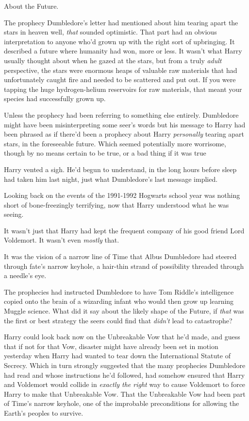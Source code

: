 About the Future.

The prophecy Dumbledore's letter had mentioned about him tearing apart the
stars in heaven{\el} well, \emph{that} sounded optimistic. That part had an
obvious interpretation to anyone who'd grown up with the right sort of
upbringing. It described a future where humanity had won, more or less. It
wasn't what Harry usually thought about when he gazed at the stars, but from a
truly \emph{adult} perspective, the stars were enormous heaps of valuable raw
materials that had unfortunately caught fire and needed to be scattered and put
out. If you were tapping the huge hydrogen-helium reservoirs for raw materials,
that meant your species had successfully grown up.

Unless the prophecy had been referring to something else entirely. Dumbledore
might have been misinterpreting some seer's words{\el} but his message to
Harry had been phrased as if there'd been a prophecy about Harry
\emph{personally} tearing apart stars, in the foreseeable future. Which seemed
potentially more worrisome, though by no means certain to be true, or a bad
thing if it was true{\el}

Harry vented a sigh. He'd begun to understand, in the long hours before sleep
had taken him last night, just what Dumbledore's last message implied.

Looking back on the events of the 1991-1992 Hogwarts school year was nothing
short of bone-freezingly terrifying, now that Harry understood what he was
seeing.

It wasn't just that Harry had kept the frequent company of his good friend Lord
Voldemort. It wasn't even \emph{mostly} that.

It was the vision of a narrow line of Time that Albus Dumbledore had steered
through fate's narrow keyhole, a hair-thin strand of possibility threaded
through a needle's eye.

The prophecies had instructed Dumbledore to have Tom Riddle's intelligence
copied onto the brain of a wizarding infant who would then grow up learning
Muggle science. What did it say about the likely shape of the Future, if
\emph{that} was the first or best strategy the seers could find that
\emph{didn't} lead to catastrophe?

Harry could look back now on the Unbreakable Vow that he'd made, and guess that
if not for that Vow, disaster might have already been set in motion yesterday
when Harry had wanted to tear down the International Statute of Secrecy. Which
in turn strongly suggested that the many prophecies Dumbledore had read and
whose instructions he'd followed, had somehow ensured that Harry and Voldemort
would collide in \emph{exactly the right} way to cause Voldemort to force Harry
to make that Unbreakable Vow. That the Unbreakable Vow had been part of Time's
narrow keyhole, one of the improbable preconditions for allowing the Earth's
peoples to survive.

